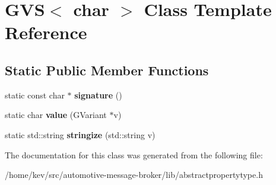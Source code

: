 \hypertarget{classGVS_3_01char_01_4}{\section{G\-V\-S$<$ char $>$ Class Template Reference}
\label{classGVS_3_01char_01_4}
}
\subsection*{Static Public Member Functions}
\begin{DoxyCompactItemize}
\item 
\hypertarget{classGVS_3_01char_01_4_a99899c615057156f961eee40c3ffa054}{static const char $\ast$ {\bfseries signature} ()}\label{classGVS_3_01char_01_4_a99899c615057156f961eee40c3ffa054}

\item 
\hypertarget{classGVS_3_01char_01_4_a1ea37cc4e2f186ed71296a856bde3ea0}{static char {\bfseries value} (G\-Variant $\ast$v)}\label{classGVS_3_01char_01_4_a1ea37cc4e2f186ed71296a856bde3ea0}

\item 
\hypertarget{classGVS_3_01char_01_4_ab3eb5abbfb3a71184aa7741a5bd25dd8}{static std\-::string {\bfseries stringize} (std\-::string v)}\label{classGVS_3_01char_01_4_ab3eb5abbfb3a71184aa7741a5bd25dd8}

\end{DoxyCompactItemize}


The documentation for this class was generated from the following file\-:\begin{DoxyCompactItemize}
\item 
/home/kev/src/automotive-\/message-\/broker/lib/abstractpropertytype.\-h\end{DoxyCompactItemize}
